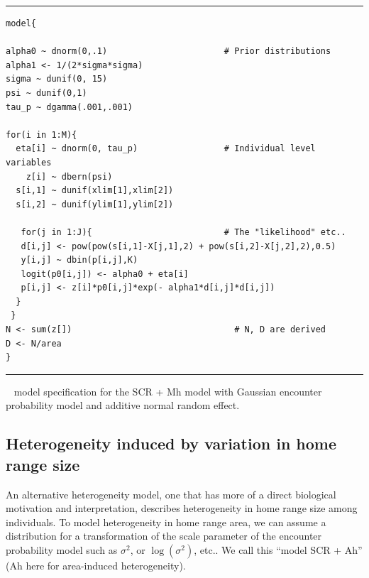\begin{panel}[htp]
\centering
\rule[0.1in]{\textwidth}{.03in}
{\small
\begin{verbatim}
model{

alpha0 ~ dnorm(0,.1)                       # Prior distributions
alpha1 <- 1/(2*sigma*sigma)
sigma ~ dunif(0, 15)
psi ~ dunif(0,1)
tau_p ~ dgamma(.001,.001)

for(i in 1:M){
  eta[i] ~ dnorm(0, tau_p)                 # Individual level variables
    z[i] ~ dbern(psi)
  s[i,1] ~ dunif(xlim[1],xlim[2])
  s[i,2] ~ dunif(ylim[1],ylim[2])

   for(j in 1:J){                          # The "likelihood" etc..
   d[i,j] <- pow(pow(s[i,1]-X[j,1],2) + pow(s[i,2]-X[j,2],2),0.5)
   y[i,j] ~ dbin(p[i,j],K)
   logit(p0[i,j]) <- alpha0 + eta[i]
   p[i,j] <- z[i]*p0[i,j]*exp(- alpha1*d[i,j]*d[i,j])
  }
 }
N <- sum(z[])                                # N, D are derived
D <- N/area
}
\end{verbatim}
}

\rule[-0.1in]{\textwidth}{.03in}
\caption{
\jags~ model specification for the SCR + Mh model with Gaussian
encounter 
probability model and additive normal random effect.
}
\label{covariates.panel.SCRMhjags}
\end{panel}




\subsection{Heterogeneity induced by variation in home range size} 
\label{covariates.sec.heterogeneityHR}

An alternative heterogeneity model, one that has more of a direct
biological motivation and interpretation, describes heterogeneity in
home range size among individuals.
To model heterogeneity in home range
area, we can  assume a distribution for
a transformation of the scale
parameter of the encounter  probability model such as $\sigma^{2}$, or
$\log(\sigma^2)$, etc..
We call this 
``model SCR + Ah'' (Ah here for area-induced heterogeneity).

